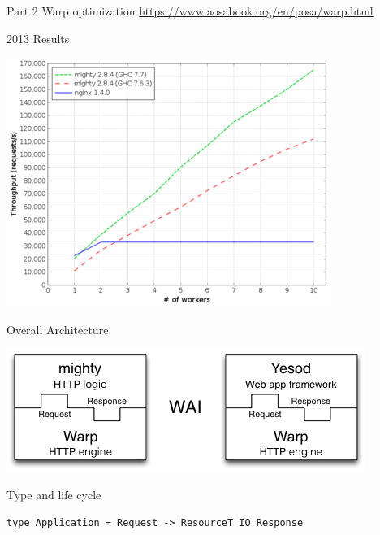 \documentclass[presentation]{beamer}
\begin{document}
\begin{frame}[label={sec:org785492e},fragile]{Part 2 Warp optimization}
\url{https://www.aosabook.org/en/posa/warp.html}
\begin{block}{2013 Results}
\begin{center}
\includegraphics[width=.9\linewidth]{Part_2_warp/2020-08-20_14-50-23_screenshot.png}
\end{center}
\end{block}
\begin{block}{Overall Architecture}
\begin{center}
\includegraphics[width=.9\linewidth]{Part_2_Warp_optimization/2020-08-20_15-46-34_screenshot.png}
\end{center}
\end{block}
\begin{block}{Type and life cycle}
\begin{verbatim}
type Application = Request -> ResourceT IO Response
\end{verbatim}


\end{block}
\end{frame}
\end{document}
